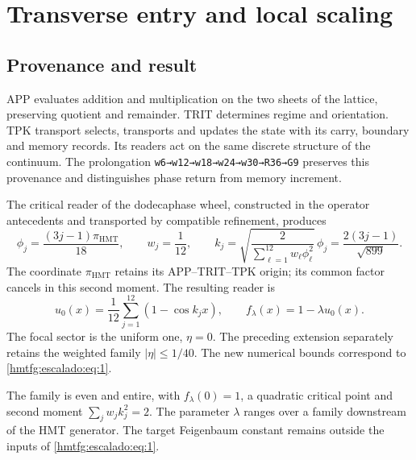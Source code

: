 \section{Transverse entry and local scaling}
\label{hmtfg:fragmento:entrada-transversal-y-escalado-local}

\subsection{Provenance and result}
\label{hmtfg:escalado:1}

APP evaluates addition and multiplication on the two sheets of the lattice, preserving quotient and remainder. TRIT determines regime and orientation. TPK transport selects, transports and updates the state with its carry, boundary and memory records. Its readers act on the same discrete structure of the continuum. The prolongation \texttt{w6→w12→w18→w24→w30→R36→G9} preserves this provenance and distinguishes phase return from memory increment.

The critical reader of the dodecaphase wheel, constructed in the operator antecedents and transported by compatible refinement, produces
\[
\phi_j=\frac{(3j-1)\pi_{\mathrm{HMT}}}{18},\qquad
w_j=\frac1{12},\qquad
k_j=\sqrt{\frac2{\sum_{\ell=1}^{12}w_\ell\phi_\ell^2}}\,\phi_j
=\frac{2(3j-1)}{\sqrt{899}}.
\]
The coordinate \(\pi_{\mathrm{HMT}}\) retains its APP–TRIT–TPK origin; its common factor cancels in this second moment. The resulting reader is
\begin{equation}
u_0(x)=\frac1{12}\sum_{j=1}^{12}(1-\cos k_jx),\qquad
f_\lambda(x)=1-\lambda u_0(x).
\label{hmtfg:escalado:eq:1}
\end{equation}
The focal sector is the uniform one, \(\eta=0\). The preceding extension separately retains the weighted family \(|\eta|\le1/40\). The new numerical bounds correspond to \eqref{hmtfg:escalado:eq:1}.

The family is even and entire, with \(f_\lambda(0)=1\), a quadratic critical point and second moment \(\sum_jw_jk_j^2=2\). The parameter \(\lambda\) ranges over a family downstream of the HMT generator. The target Feigenbaum constant remains outside the inputs of \eqref{hmtfg:escalado:eq:1}.

